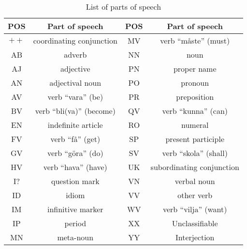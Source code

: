 \begin{table}
\begin{tabular}{c|c||c|c}
  POS & Part of speech & POS & Part of speech \\ \hline
 $++$ & coordinating conjunction&MV & verb ``m\aa{}ste'' (must) \\
 AB & adverb&NN & noun \\
 AJ & adjective&PN & proper name \\
 AN & adjectival noun&PO & pronoun \\
 AV & verb ``vara'' (be)&PR & preposition \\
 BV & verb ``bli(va)'' (become) &QV & verb ``kunna'' (can) \\
EN & indefinite article&RO & numeral \\
 FV & verb ``f\aa{}'' (get) &SP & present participle \\
 GV & verb ``g\"ora'' (do) &SV & verb ``skola'' (shall) \\
 HV & verb ``hava'' (have) &UK & subordinating conjunction \\
 I? & question mark &VN & verbal noun \\
 ID & idiom &VV & other verb \\
 IM & infinitive marker &WV & verb ``vilja'' (want) \\
 IP & period &XX & Unclassifiable \\
MN & meta-noun &YY & Interjection \\ \hline
\end{tabular}
\vspace{5mm}
\caption{List of parts of speech}
\label{pos-list}
\end{table}

